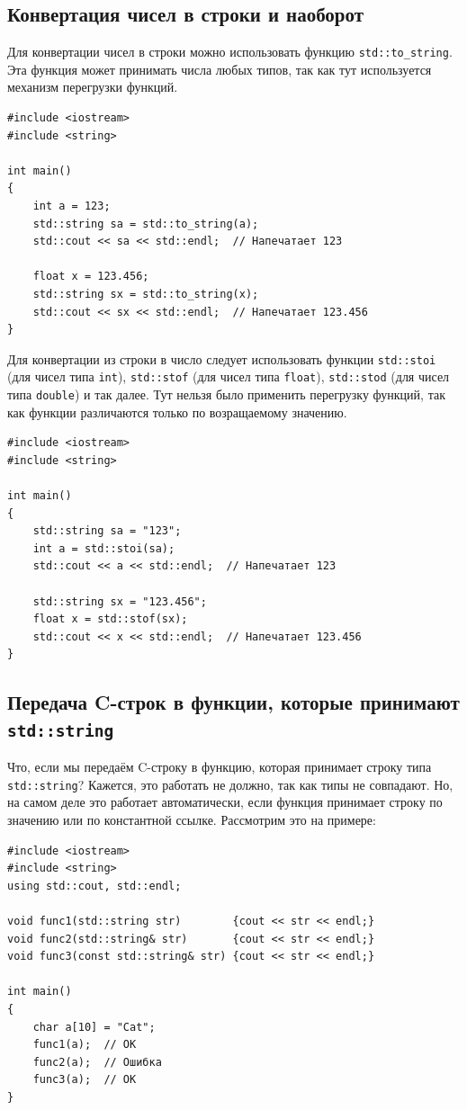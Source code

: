 \documentclass{article}
\begin{document}
\subsection*{Конвертация чисел в строки и наоборот}
Для конвертации чисел в строки можно использовать функцию \texttt{std::to\_string}. Эта функция может принимать числа любых типов, так как тут используется механизм перегрузки функций.
\begin{lstlisting}
#include <iostream>
#include <string>

int main()
{
    int a = 123;
    std::string sa = std::to_string(a);
    std::cout << sa << std::endl;  // Напечатает 123
    
    float x = 123.456;
    std::string sx = std::to_string(x);
    std::cout << sx << std::endl;  // Напечатает 123.456
}
\end{lstlisting}
Для конвертации из строки в число следует использовать функции \texttt{std::stoi} (для чисел типа \texttt{int}), \texttt{std::stof} (для чисел типа \texttt{float}),  \texttt{std::stod} (для чисел типа \texttt{double}) и так далее. Тут нельзя было применить перегрузку функций, так как функции различаются только по возращаемому значению.
\begin{lstlisting}
#include <iostream>
#include <string>

int main()
{
    std::string sa = "123";
    int a = std::stoi(sa);
    std::cout << a << std::endl;  // Напечатает 123
    
    std::string sx = "123.456";
    float x = std::stof(sx);
    std::cout << x << std::endl;  // Напечатает 123.456
}
\end{lstlisting}


\subsection*{Передача C-строк в функции, которые принимают \texttt{std::string}}
Что, если мы передаём C-строку в функцию, которая принимает строку типа \texttt{std::string}? Кажется, это работать не должно, так как типы не совпадают. Но, на самом деле это работает автоматически, если функция принимает строку по значению или по константной ссылке. Рассмотрим это на примере:
\begin{lstlisting}
#include <iostream>
#include <string>
using std::cout, std::endl;

void func1(std::string str)        {cout << str << endl;}
void func2(std::string& str)       {cout << str << endl;}
void func3(const std::string& str) {cout << str << endl;}

int main()
{
    char a[10] = "Cat";
    func1(a);  // OK
    func2(a);  // Ошибка
    func3(a);  // OK
}
\end{lstlisting}
\end{document}
